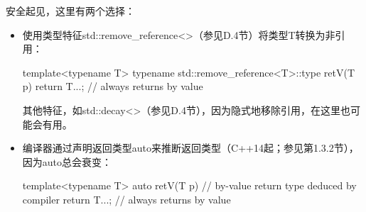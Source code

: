 安全起见，这里有两个选择：

\begin{itemize}
\item 
使用类型特征std::remove\_reference<>（参见D.4节）将类型T转换为非引用：

\begin{cpp}
template<typename T>
typename std::remove_reference<T>::type retV(T p)
{
	return T{...}; // always returns by value
}
\end{cpp}

其他特征，如std::decay<>（参见D.4节），因为隐式地移除引用，在这里也可能会有用。

\item 
编译器通过声明返回类型auto来推断返回类型（C++14起；参见第1.3.2节），因为auto总会衰变：

\begin{cpp}
template<typename T>
auto retV(T p) // by-value return type deduced by compiler
{
	return T{...}; // always returns by value
}
\end{cpp}

\end{itemize}



















